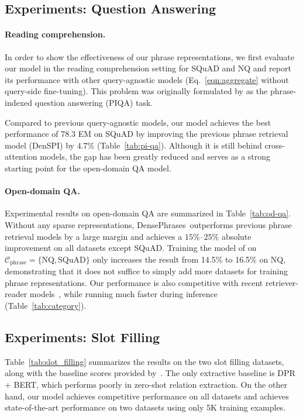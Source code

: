 \documentclass[11pt,a4paper]{article}
\newcommand{\ours}{DensePhrases}
\newcommand{\traincorpus}{\mathcal{C}}
\begin{document}
 \subsection{Experiments: Question Answering}\label{sec:openqa_result}
\paragraph{Reading comprehension.}\label{sec:rc_result}
In order to show the effectiveness of our phrase representations, we first evaluate our model in the reading comprehension setting for SQuAD and NQ and report its performance with other query-agnostic models (Eq.~\eqref{eqn:aggregate} without query-side fine-tuning). This problem was originally formulated by  as the phrase-indexed question answering (PIQA) task.

Compared to previous query-agnostic models, our model achieves the best performance of 78.3 EM on SQuAD by improving the previous phrase retrieval model (DenSPI) by $4.7\%$ (Table~\ref{tab:pi-qa}). Although it is still behind cross-attention models, the gap has been greatly reduced and serves as a strong starting point for the open-domain QA model.

\paragraph{Open-domain QA.}
Experimental results on open-domain QA are summarized in Table~\ref{tab:od-qa}.
Without any sparse representations, \ours~outperforms previous phrase retrieval models by a large margin and achieves a $15\%$--$25\%$ absolute improvement on all datasets except SQuAD.
Training the model of  on $\traincorpus_\text{phrase}=\{\text{NQ}, \text{SQuAD}\}$ only increases the result from 14.5\% to 16.5\% on NQ, demonstrating that it does not suffice to simply add more datasets for training phrase representations.
Our performance is also competitive with recent retriever-reader models~\cite{karpukhin2020dense}, while running much faster during inference (Table~\ref{tab:category}).


\subsection{Experiments: Slot Filling}\label{sec:slot_filling}
Table~\ref{tab:slot_filling} summarizes the results on the two slot filling datasets, along with the baseline scores provided by~\citet{petroni2020kilt}.
The only extractive baseline is DPR + BERT, which performs poorly in zero-shot relation extraction.
On the other hand, our model achieves competitive performance on all datasets and achieves state-of-the-art performance on two datasets using only 5K training examples. 
\end{document}
